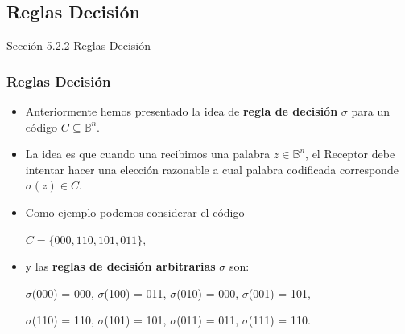 \documentclass{beamer}
\theoremstyle{plain}
\theoremstyle{example}
\theoremstyle{example}
\begin{document}


\subsection{Reglas Decisión}

\begin{frame}   \footnotesize
{
\begin{block}{Sección 5.2.2}
Reglas Decisión
\end{block}
}
\end{frame} 
\begin{frame}  \frametitle{Reglas Decisión}\small  
\begin{itemize} 

\item  Anteriormente hemos presentado la idea de \textbf{regla de decisión} $\sigma$ para un código $C \subseteq \mathbb{B}^n$. 


\item La idea es que cuando una recibimos una palabra $z \in \mathbb{B}^n$, el Receptor debe intentar hacer una elección razonable a cual palabra codificada corresponde $\sigma(z) \in C$. 

\item Como ejemplo podemos considerar el código 

\begin{center}
$C = \{000, 110, 101, 011\},$ 
\end{center}

\item  y las \textbf{reglas de decisión arbitrarias} $\sigma$ son:


\begin{center}
$\sigma$(000) = 000,	$\sigma$(100) = 011,	$\sigma$(010) = 000,	$\sigma$(001) = 101, 
\end{center}
\begin{center}
$\sigma$(110) = 110,	$\sigma$(101) = 101,	$\sigma$(011) = 011,	$\sigma$(111) = 110.
\end{center}

\end{itemize} \end{frame} 
\end{document}
